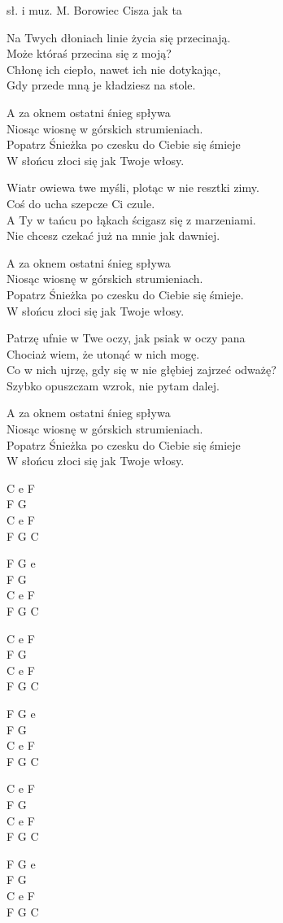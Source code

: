{sł. i muz. M. Borowiec}
{Cisza jak ta}
\begin{text}
Na Twych dłoniach linie życia się przecinają.\\
Może któraś przecina się z moją?\\
Chłonę ich ciepło, nawet ich nie dotykając,\\
Gdy przede mną je kładziesz na stole.

\vin A za oknem ostatni śnieg spływa\\
\vin Niosąc wiosnę w górskich strumieniach.\\
\vin Popatrz Śnieżka po czesku do Ciebie się śmieje\\
\vin W słońcu złoci się jak Twoje włosy.

Wiatr owiewa twe myśli, plotąc w nie resztki zimy.\\
Coś do ucha szepcze Ci czule.\\
A Ty w tańcu po łąkach ścigasz się z marzeniami.\\
Nie chcesz czekać już na mnie jak dawniej.

\vin A za oknem ostatni śnieg spływa\\
\vin Niosąc wiosnę w górskich strumieniach.\\
\vin Popatrz Śnieżka po czesku do Ciebie się śmieje.\\
\vin W słońcu złoci się jak Twoje włosy.

Patrzę ufnie w Twe oczy, jak psiak w oczy pana\\
Chociaż wiem, że utonąć w nich mogę.\\
Co w nich ujrzę, gdy się w nie głębiej zajrzeć odważę? \\
Szybko opuszczam wzrok, nie pytam dalej.

\vin A za oknem ostatni śnieg spływa\\
\vin Niosąc wiosnę w górskich strumieniach.\\
\vin Popatrz Śnieżka po czesku do Ciebie się śmieje\\
\vin W słońcu złoci się jak Twoje włosy.
\end{text}
\begin{chord}
C e F\\
F G\\
C e F\\
F G C

\vin F G e\\
\vin F G\\
\vin C e F\\
\vin F G C

C e F\\
F G\\
C e F\\
F G C

\vin F G e\\
\vin F G\\
\vin C e F\\
\vin F G C

C e F\\
F G\\
C e F\\
F G C

\vin F G e\\
\vin F G\\
\vin C e F\\
\vin F G C
\end{chord}
